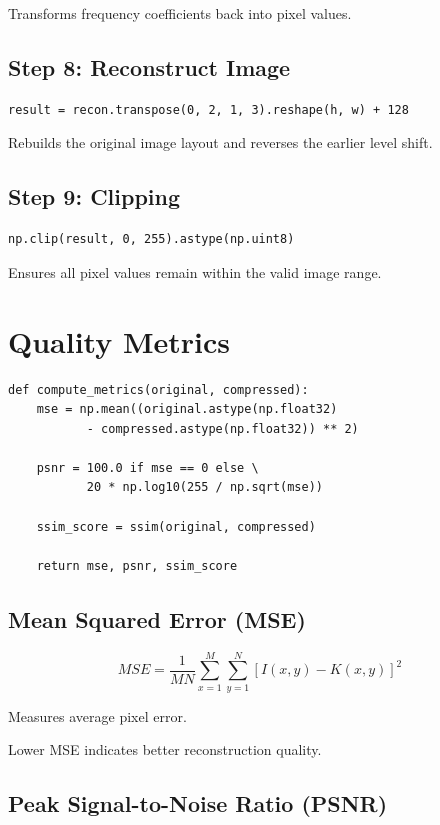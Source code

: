 \documentclass[12pt,a4paper]{article}
\begin{document}
Transforms frequency coefficients back into pixel values.

\subsection{Step 8: Reconstruct Image}

\begin{lstlisting}
result = recon.transpose(0, 2, 1, 3).reshape(h, w) + 128
\end{lstlisting}

Rebuilds the original image layout and reverses the earlier level shift.

\subsection{Step 9: Clipping}

\begin{lstlisting}
np.clip(result, 0, 255).astype(np.uint8)
\end{lstlisting}

Ensures all pixel values remain within the valid image range.

\section{Quality Metrics}

\begin{lstlisting}
def compute_metrics(original, compressed):
    mse = np.mean((original.astype(np.float32)
           - compressed.astype(np.float32)) ** 2)

    psnr = 100.0 if mse == 0 else \
           20 * np.log10(255 / np.sqrt(mse))

    ssim_score = ssim(original, compressed)

    return mse, psnr, ssim_score
\end{lstlisting}

\subsection{Mean Squared Error (MSE)}

\[
MSE = \frac{1}{MN}\sum_{x=1}^{M}\sum_{y=1}^{N}
[I(x,y)-K(x,y)]^2
\]

Measures average pixel error.

Lower MSE indicates better reconstruction quality.

\subsection{Peak Signal-to-Noise Ratio (PSNR)}
\end{document}
